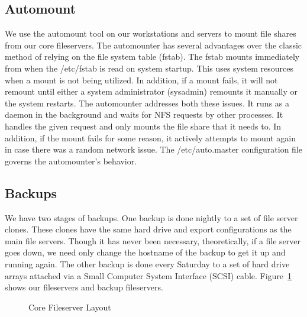 \subsection{Automount}
We use the automount tool on our workstations and servers to mount file shares from our core fileservers.  The automounter has several advantages over the classic method of relying on the file system table (fstab).  The fstab mounts immediately from when the /etc/fstab is read on system startup.  This uses system resources when a mount is not being utilized.  In addition, if a mount fails, it will not remount until either a system administrator (sysadmin) remounts it manually or the system restarts.  The automounter addresses both these issues.  It runs as a daemon in the background and waits for NFS requests by other processes.  It handles the given request and only mounts the file share that it needs to.  In addition, if the mount fails for some reason, it actively attempts to mount again in case there was a random network issue.  The /etc/auto.master configuration file governs the automounter's behavior.

\subsection{Backups}
We have two stages of backups.  One backup is done nightly to a set of file server clones.  These clones have the same hard drive and export configurations as the main file servers.  Though it has never been necessary, theoretically, if a file server goes down, we need only change the hostname of the backup to get it up and running again.  The other backup is done every Saturday to a set of hard drive arrays attached via a Small Computer System Interface (SCSI) cable.  Figure~\ref{fig:FileserverLayout} shows our fileservers and backup fileservers.

\begin{figure}
  \begin{center}
  \end{center}
  \caption{Core Fileserver Layout}
  \label{fig:FileserverLayout}
\end{figure}

